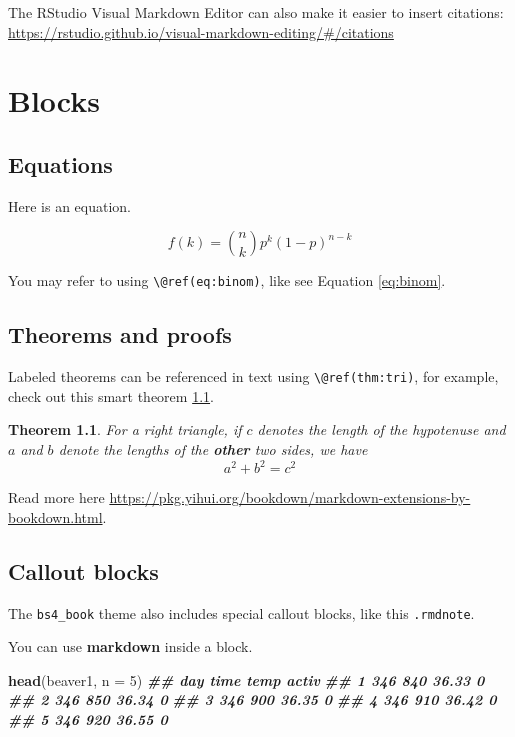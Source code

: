 \documentclass[
]{book}
\newenvironment{Shaded}{\begin{snugshade}}{\end{snugshade}}
\newcommand{\AttributeTok}[1]{\textcolor[rgb]{0.13,0.29,0.53}{#1}}
\newcommand{\DecValTok}[1]{\textcolor[rgb]{0.00,0.00,0.81}{#1}}
\newcommand{\DocumentationTok}[1]{\textcolor[rgb]{0.56,0.35,0.01}{\textbf{\textit{#1}}}}
\newcommand{\FunctionTok}[1]{\textcolor[rgb]{0.13,0.29,0.53}{\textbf{#1}}}
\newcommand{\NormalTok}[1]{#1}
\newtheorem{theorem}{Theorem}[chapter]
\theoremstyle{definition}
\theoremstyle{definition}
\theoremstyle{definition}
\theoremstyle{definition}
\theoremstyle{remark}
\begin{document}
The RStudio Visual Markdown Editor can also make it easier to insert citations: \url{https://rstudio.github.io/visual-markdown-editing/\#/citations}

\chapter{Blocks}\label{blocks}

\section{Equations}\label{equations}

Here is an equation.

\begin{equation} 
  f\left(k\right) = \binom{n}{k} p^k\left(1-p\right)^{n-k}
  \label{eq:binom}
\end{equation}

You may refer to using \texttt{\textbackslash{}@ref(eq:binom)}, like see Equation \eqref{eq:binom}.

\section{Theorems and proofs}\label{theorems-and-proofs}

Labeled theorems can be referenced in text using \texttt{\textbackslash{}@ref(thm:tri)}, for example, check out this smart theorem \ref{thm:tri}.

\begin{theorem}
\protect\hypertarget{thm:tri}{}\label{thm:tri}For a right triangle, if \(c\) denotes the \emph{length} of the hypotenuse
and \(a\) and \(b\) denote the lengths of the \textbf{other} two sides, we have
\[a^2 + b^2 = c^2\]
\end{theorem}

Read more here \url{https://pkg.yihui.org/bookdown/markdown-extensions-by-bookdown.html}.

\section{Callout blocks}\label{callout-blocks}

The \texttt{bs4\_book} theme also includes special callout blocks, like this \texttt{.rmdnote}.

You can use \textbf{markdown} inside a block.

\begin{Shaded}
\begin{Highlighting}[]
\FunctionTok{head}\NormalTok{(beaver1, }\AttributeTok{n =} \DecValTok{5}\NormalTok{)}
\DocumentationTok{\#\#   day time  temp activ}
\DocumentationTok{\#\# 1 346  840 36.33     0}
\DocumentationTok{\#\# 2 346  850 36.34     0}
\DocumentationTok{\#\# 3 346  900 36.35     0}
\DocumentationTok{\#\# 4 346  910 36.42     0}
\DocumentationTok{\#\# 5 346  920 36.55     0}
\end{Highlighting}
\end{Shaded}
\end{document}
